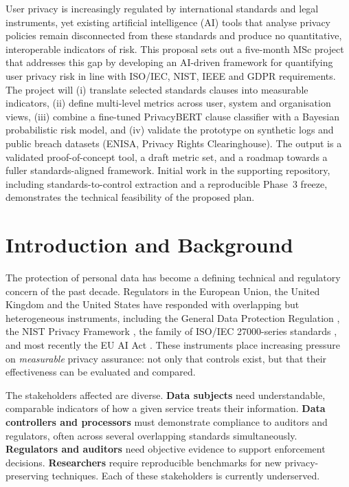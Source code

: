 \documentclass[12pt,a4paper,titlepage]{article}
\begin{document}
User privacy is increasingly regulated by international standards and legal instruments, yet existing artificial intelligence (AI) tools that analyse privacy policies remain disconnected from these standards and produce no quantitative, interoperable indicators of risk. This proposal sets out a five-month MSc project that addresses this gap by developing an AI-driven framework for quantifying user privacy risk in line with ISO/IEC, NIST, IEEE and GDPR requirements. The project will (i) translate selected standards clauses into measurable indicators, (ii) define multi-level metrics across user, system and organisation views, (iii) combine a fine-tuned PrivacyBERT clause classifier with a Bayesian probabilistic risk model, and (iv) validate the prototype on synthetic logs and public breach datasets (ENISA, Privacy Rights Clearinghouse). The output is a validated proof-of-concept tool, a draft metric set, and a roadmap towards a fuller standards-aligned framework. Initial work in the supporting repository, including standards-to-control extraction and a reproducible Phase~3 freeze, demonstrates the technical feasibility of the proposed plan.

\section{Introduction and Background}\label{sec:intro}

The protection of personal data has become a defining technical and regulatory concern of the past decade. Regulators in the European Union, the United Kingdom and the United States have responded with overlapping but heterogeneous instruments, including the General Data Protection Regulation \parencite{gdpr2016}, the NIST Privacy Framework \parencite{nist_pf_2020}, the family of ISO/IEC 27000-series standards \parencite{iso27001_2022, iso27701_2019, iso29100_2011, iso29151_2017}, and most recently the EU AI Act \parencite{eu_ai_act_2024}. These instruments place increasing pressure on \emph{measurable} privacy assurance: not only that controls exist, but that their effectiveness can be evaluated and compared.

The stakeholders affected are diverse. \textbf{Data subjects} need understandable, comparable indicators of how a given service treats their information. \textbf{Data controllers and processors} must demonstrate compliance to auditors and regulators, often across several overlapping standards simultaneously. \textbf{Regulators and auditors} need objective evidence to support enforcement decisions. \textbf{Researchers} require reproducible benchmarks for new privacy-preserving techniques. Each of these stakeholders is currently underserved.
\end{document}
